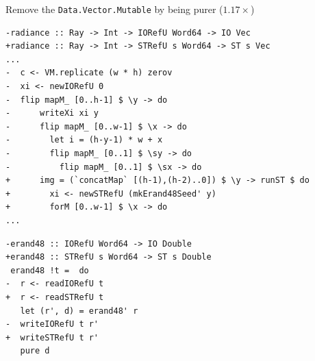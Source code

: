 \documentclass[8pt]{beamer}
\begin{document}
\begin{frame}[fragile]{Remove the \texttt{Data.Vector.Mutable} by being purer ($1.17\times$)}
\begin{verbatim}
-radiance :: Ray -> Int -> IORefU Word64 -> IO Vec
+radiance :: Ray -> Int -> STRefU s Word64 -> ST s Vec
...
-  c <- VM.replicate (w * h) zerov
-  xi <- newIORefU 0
-  flip mapM_ [0..h-1] $ \y -> do
-      writeXi xi y
-      flip mapM_ [0..w-1] $ \x -> do
-        let i = (h-y-1) * w + x
-        flip mapM_ [0..1] $ \sy -> do
-          flip mapM_ [0..1] $ \sx -> do
+      img = (`concatMap` [(h-1),(h-2)..0]) $ \y -> runST $ do
+        xi <- newSTRefU (mkErand48Seed' y)
+        forM [0..w-1] $ \x -> do
...
\end{verbatim}

\begin{verbatim}
-erand48 :: IORefU Word64 -> IO Double
+erand48 :: STRefU s Word64 -> ST s Double
 erand48 !t =  do
-  r <- readIORefU t
+  r <- readSTRefU t
   let (r', d) = erand48' r
-  writeIORefU t r'
+  writeSTRefU t r'
   pure d
\end{verbatim}
\end{frame}

\end{document}
